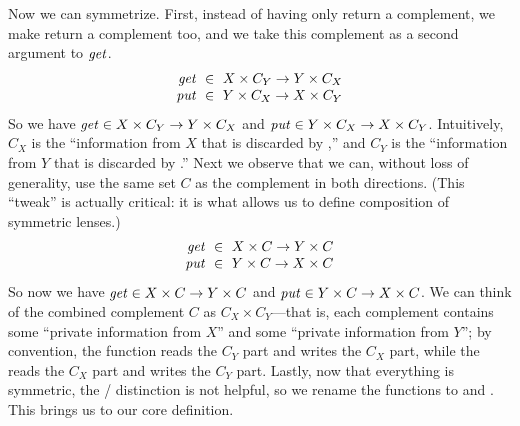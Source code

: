 %
Now we can symmetrize.  
First, instead of having only \GET{} return a complement, we make \PUT{}
return a complement too, and we take this complement as a second argument
to $\mathit{get}$.
%
\iffull
\[
\begin{array}{r@{\ \;}c@{\ \;}l}
\GET &\in& X \times C_Y \arrow Y \times C_X\\
\PUT &\in& Y \times C_X \arrow X \times C_Y
\end{array}
\]
\else
So we have $\mathit{get} \in X \times C_Y \rightarrow Y \times C_X$ and 
$\mathit{put} \in Y \times C_X \rightarrow X \times C_Y$.
\fi
%
Intuitively, $C_X$ is the ``information from $X$ that is discarded by
\GET,'' and $C_Y$ is the ``information from $Y$ that is discarded by
\PUT.''  Next we observe that we can, without loss of generality, use the
same set $C$ as the complement in both directions.  \iffull (This ``tweak''
is actually critical: it is what allows us to define composition of symmetric
lenses.)\fi
\iffull
\[
\begin{array}{r@{\ \;}c@{\ \;}l}
\GET &\in& X \times C \arrow Y \times C\\
\PUT &\in& Y \times C \arrow X \times C
\end{array}
\]
\else
So now we have 
$\mathit{get} \in X \times C \rightarrow Y \times C$ and
$\mathit{put} \in Y \times C \rightarrow X \times C$.
\fi
%
We can think of the combined complement $C$ as $C_X \times
C_Y$---that is, each complement contains some ``private information from
$X$'' and some ``private information from $Y$''; by convention, the \GET{}
function reads the $C_Y$ part and writes the $C_X$ part, while the \PUT{}
reads the $C_X$ part and writes the $C_Y$ part.  
%
Lastly, now that everything is symmetric, the \GET{} / \PUT{} distinction is not
helpful, so we rename the functions to \PUTR{} and \PUTL.  This brings us to
our core definition.


